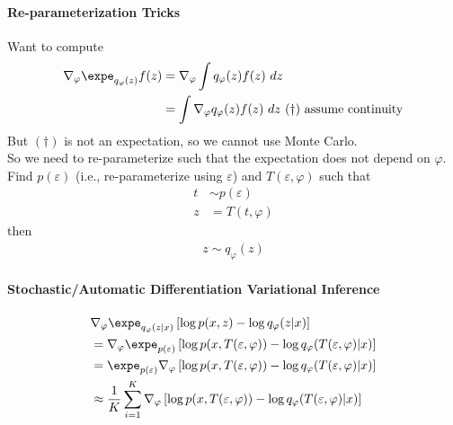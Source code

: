 \documentclass{article}
\begin{document}
	\paragraph{Re-parameterization Tricks} Want to compute
	\begin{align}
		\nabla_\varphi \expe_{q_\varphi(z)} f(z) &= \nabla_\varphi \int q_\varphi(z) f(z)\ dz \\
		&= \int \nabla_\varphi q_\varphi(z) f(z)\ dz\ (\dagger)\tx{ assume continuity}
	\end{align}
	But $(\dagger)$ is not an expectation, so we cannot use Monte Carlo. \\
	So we need to re-parameterize such that the expectation does not depend on $\varphi$. \\
	Find $p(\varepsilon)$ (i.e., re-parameterize using $\varepsilon$) and $T(\varepsilon, \varphi)$ such that
	\begin{align}
		t &\sim p(\varepsilon) \\
		z &= T(t, \varphi)
	\end{align}
	then
	\begin{align}
		z \sim q_\varphi(z)
	\end{align}
	\paragraph{Stochastic/Automatic Differentiation Variational Inference}
	\begin{align}
		&\nabla_\varphi \expe_{q_\varphi(z|x)} \left[
		\log p(x,z) - \log q_\varphi(z|x)
		\right] \\
		&= \nabla_\varphi \expe_{p(\varepsilon)} \left[
		\log p(x,T(\varepsilon , \varphi)) - \log q_\varphi (T(\varepsilon, \varphi)|x)
		\right] \\
		&= \expe_{p(\varepsilon)} \nabla_\varphi \left[
		\log p(x,T(\varepsilon , \varphi)) - \log q_\varphi (T(\varepsilon, \varphi)|x)
		\right] \\
		&\approx \frac{1}{K} \sum_{i=1}^K \nabla_\varphi \left[
		\log p(x,T(\varepsilon , \varphi)) - \log q_\varphi (T(\varepsilon, \varphi)|x)
		\right]
	\end{align}
	
\end{document}
